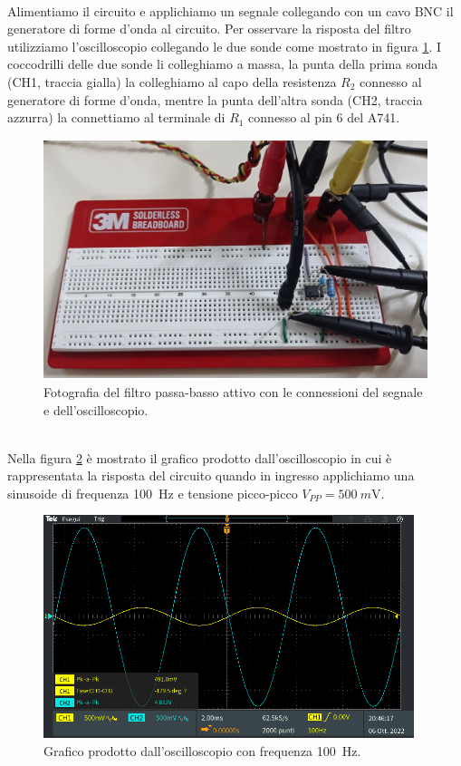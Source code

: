 \documentclass{report}
\begin{document}
\\Alimentiamo il circuito e applichiamo un segnale collegando con un cavo BNC il generatore di forme d'onda al circuito. Per osservare la risposta del filtro utilizziamo l'oscilloscopio collegando le due sonde come mostrato in figura \ref{figura:connessioni}. I coccodrilli delle due sonde li colleghiamo a massa, la punta della prima sonda (CH1, traccia gialla) la colleghiamo al capo della resistenza $R_2$ connesso al generatore di forme d'onda, mentre la punta dell'altra sonda (CH2, traccia azzurra) la connettiamo al terminale di $R_1$ connesso al pin 6 del \textmu A741.
\begin{figure}[h!]
\centering
\includegraphics[height=7cm]{immagini/circuito_sonde}
\caption{Fotografia del filtro passa-basso attivo con le connessioni del segnale e dell'oscilloscopio.}
\label{figura:connessioni}
\end{figure}
\\Nella figura \ref{figura:TEK1} è mostrato il grafico prodotto dall'oscilloscopio in cui è rappresentata la risposta del circuito quando in ingresso applichiamo una sinusoide di frequenza \SI{100}{\hertz} e tensione picco-picco $V_{PP}=\SI{500}{m\volt}$.
\begin{figure}[h!]
	\centering
	\includegraphics[height=6.5cm]{immagini/TEK00001}
	\caption{Grafico prodotto dall'oscilloscopio con frequenza \SI{100}{\hertz}.}
	\label{figura:TEK1}
\end{figure}
\end{document}
